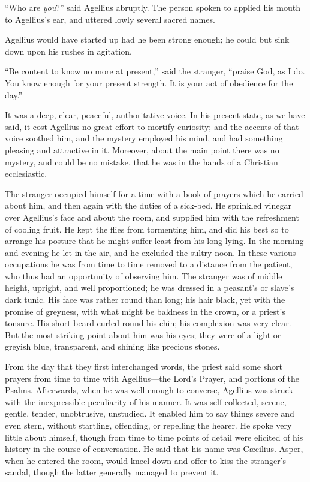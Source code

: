 ``Who are \emph{you}?'' said Agellius abruptly. The person
spoken to applied his mouth to Agellius's ear, and uttered lowly
several sacred names.

Agellius would have started up had he been strong enough; he could
but sink down upon his rushes in agitation.

``Be content to know no more at present,'' said the
stranger, ``praise God, as I do. You know enough for your present
strength. It is your act of obedience for the day.''

It was a deep, clear, peaceful, authoritative voice. In his present
state, as we have said, it cost Agellius no great effort to mortify
curiosity; and the accents of that voice soothed him, and the mystery
employed his mind, and had something pleasing and attractive in it.
Moreover, about the main point there was no mystery, and could be no
mistake, that he was in the hands of a Christian ecclesiastic.

The stranger occupied himself for a time with a book of prayers
which he carried about him, and then again with the duties of a
sick-bed. He sprinkled vinegar over Agellius's face and about the
room, and supplied him with the refreshment of cooling fruit. He kept
the flies from tormenting him, and did his best so to arrange his
posture that he might suffer least from his long lying. In the morning
and evening he let in the air, and he excluded the sultry noon. In
these various occupations he was from time to time removed to a
distance from the patient, who thus had an opportunity of observing
him. The stranger was of middle height, upright, and well
proportioned; he was dressed in a peasant's or slave's dark tunic. His
face was rather round than long; his hair black, yet with the promise
of greyness, with what might be baldness in the crown, or a priest's
tonsure. His short beard curled round his chin; his complexion was
very clear. But the most striking point about him was his eyes; they
were of a light or greyish blue, transparent, and shining like
precious stones.

From the day that they first interchanged words, the priest
said some short prayers from time to time with Agellius—the Lord's
Prayer, and portions of the Psalms. Afterwards, when he was well
enough to converse, Agellius was struck with the inexpressible
peculiarity of his manner. It was self-collected, serene, gentle,
tender, unobtrusive, unstudied. It enabled him to say things severe
and even stern, without startling, offending, or repelling the hearer.
He spoke very little about himself, though from time to time points of
detail were elicited of his history in the course of conversation. He
said that his name was Cæcilius. Asper, when he entered the room,
would kneel down and offer to kiss the stranger's sandal, though the
latter generally managed to prevent it.

